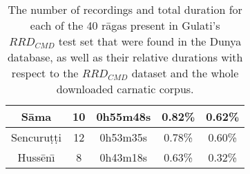 \begin{table}
{\begin{tabular}{*5c}
      S\=ama                           & 10 & 0h55m48s &      0.82\% &      0.62\%  \\\midrule
      Sencuru\d{t}\d{t}i               & 12 & 0h53m35s &      0.78\% &      0.60\%  \\\midrule
      Huss\=en\={\i}                   & 8  & 0h43m18s &      0.63\% &      0.32\%  \\\bottomrule
  \end{tabular}}
  \caption{The number of recordings and total duration for each of the 40 r\=agas present in Gulati's \(RRD_{CMD}\) test set that were found in the Dunya database, as well as their relative durations with respect to the \(RRD_{CMD}\) dataset and the whole downloaded carnatic corpus.}
  \label{fig:rrd-stats}
\end{table}

